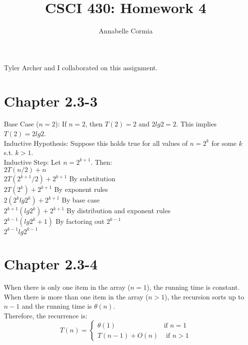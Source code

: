 \documentclass[12pt]{article}
\author{Annabelle Cormia}
\title{CSCI 430: Homework 4}
\newcommand\tab[1][1cm]{\hspace*{#1}}
\begin{document}
\maketitle

Tyler Archer and I collaborated on this assignment.\\

\section{Chapter 2.3-3}

Base Case ($n=2$): If $n=2$, then $T(2)=2$ and $2lg2=2$. This implies $T(2)=2lg2$. \\
Inductive Hypothesis: Suppose this holds true for all values of $n=2^k$ for some $k$ s.t. $k>1$. \\
Inductive Step: Let $n=2^{k+1}$. Then: \\
\tab \tab \tab $2T(n/2)+n$ \\
\tab \tab \tab $2T(2^{k+1}/2)+2^{k+1}$ \tab \tab By substitution \\
\tab \tab \tab $2T(2^k)+2^{k+1}$            \tab \tab By exponent rules \\
\tab \tab \tab $2(2^k lg 2^k)+2^{k+1}$   \tab \tab By base case \\
\tab \tab \tab $2^{k+1} (lg 2^k) + 2^{k+1}$ \tab \tab By distribution and exponent rules \\
\tab \tab \tab $2^{k-1}(lg 2^k +1)$                 \tab \tab By factoring out $2^{k-1}$ \\
\tab \tab \tab $2^{k-1} lg 2^{k-1}$

\section{Chapter 2.3-4}

When there is only one item in the array ($n=1$), the running time is constant. \\
When there is more than one item in the array ($n>1$), the recursion sorts up to $n-1$ and the running time is $\theta(n)$. \\
Therefore, the recurrence is: \\
\begin{equation*}
T(n)= \begin{cases}
	\theta(1) &\text{if $n=1$} \\
	T(n-1)+O(n) &\text{ if $n>1$}
	\end{cases}
\end{equation*}
\end{document}
